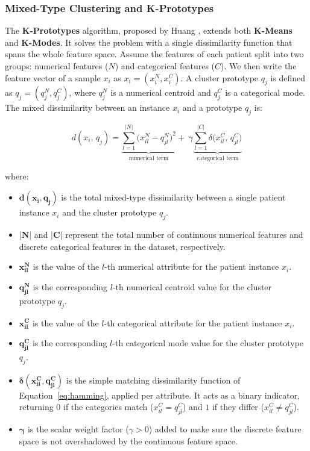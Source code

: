 \subsubsection*{Mixed-Type Clustering and K-Prototypes}

The \textbf{K-Prototypes} algorithm, proposed by Huang \cite{huang1998}, extends both \textbf{K-Means} and \textbf{K-Modes}. It solves the problem with a single dissimilarity function that spans the whole feature space. Assume the features of each patient split into two groups: numerical features ($N$) and categorical features ($C$). We then write the feature vector of a sample $x_i$ as $x_i = (x_i^N, x_i^C)$. A cluster prototype $q_j$ is defined as $q_j = (q_j^N, q_j^C)$, where $q_j^N$ is a numerical centroid and $q_j^C$ is a categorical mode. The mixed dissimilarity between an instance $x_i$ and a prototype $q_j$ is:

\vspace{1em}

\begin{equation}
    d(x_i,\, q_j) = \underbrace{\sum_{l=1}^{|N|} \bigl(x_{il}^{N} - q_{jl}^{N}\bigr)^2}_{\text{numerical term}} + \;\gamma \underbrace{\sum_{l=1}^{|C|} \delta\bigl(x_{il}^{C},\, q_{jl}^{C}\bigr)}_{\text{categorical term}}
    \label{eq:kproto_dist}
\end{equation}

where:
\begin{itemize}
    \item $\boldsymbol{d(x_i, q_j)}$ is the total mixed-type dissimilarity between a single patient instance $x_i$ and the cluster prototype $q_j$.
    \item $\boldsymbol{|N|}$ and $\boldsymbol{|C|}$ represent the total number of continuous numerical features and discrete categorical features in the dataset, respectively.
    \item $\boldsymbol{x_{il}^N}$ is the value of the $l$-th numerical attribute for the patient instance $x_i$.
    \item $\boldsymbol{q_{jl}^N}$ is the corresponding $l$-th numerical centroid value for the cluster prototype $q_j$.
    \item $\boldsymbol{x_{il}^C}$ is the value of the $l$-th categorical attribute for the patient instance $x_i$.
    \item $\boldsymbol{q_{jl}^C}$ is the corresponding $l$-th categorical mode value for the cluster prototype $q_j$.
    \item $\boldsymbol{\delta(x_{il}^C, q_{jl}^C)}$ is the simple matching dissimilarity function of Equation~\eqref{eq:hamming}, applied per attribute. It acts as a binary indicator, returning $0$ if the categories match ($x_{il}^C = q_{jl}^C$) and $1$ if they differ ($x_{il}^C \neq q_{jl}^C$).
    \item $\boldsymbol{\gamma}$ is the scalar weight factor ($\gamma > 0$) added to make sure the discrete feature space is not overshadowed by the continuous feature space.
\end{itemize}

